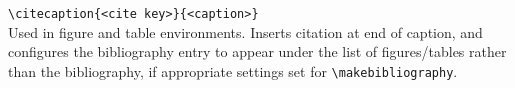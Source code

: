 \verb|\citecaption{<cite key>}{<caption>}|\\
Used in figure and table environments.
Inserts citation at end of caption, and configures the bibliography entry to appear under the list of figures/tables rather than the bibliography, if appropriate settings set for \verb|\makebibliography|.

\begin{comment}

\clearpage
\subsection{subsection 1}

\section{Test appendix 2}

\section{Test appendix 3}
\clearpage
\subsection{subsection 1}
\clearpage
\subsection{subsection 2}
\clearpage

\end{comment}
